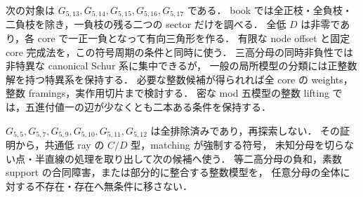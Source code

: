 次の対象は $G_{5,13},G_{5,14},G_{5,15},G_{5,16},G_{5,17}$ である．
book では全正枝・全負枝・二負枝を除き，一負枝の残る二つの sector だけを調べる．
全低 $D$ は非零であり，各 core で一正一負となって有向三角形を作る．
有限な node offset と固定 core 完成法を，この符号周期の条件と同時に使う．
三高分母の同時非負性では非特異な canonical Schur 系に集中できるが，
一般の局所模型の分類には正整数解を持つ特異系を保持する．
必要な整数候補が得られれば全 core の weights，整数 framings，実作用切片まで検討する．
密な mod 五模型の整数 lifting では，五進付値一の辺が少なくとも二本ある条件を保持する．

$G_{5,5},G_{5,7},G_{5,9},G_{5,10},G_{5,11},G_{5,12}$ は全排除済みであり，再探索しない．
その証明から，共通低 ray の $C/D$ 型，matching が強制する符号，
未知分母を切らない点・半直線の処理を取り出して次の候補へ使う．
等二高分母の負和，素数 support の合同障害，または部分的に整合する整数模型を，
任意分母の全体に対する不存在・存在へ無条件に移さない．
